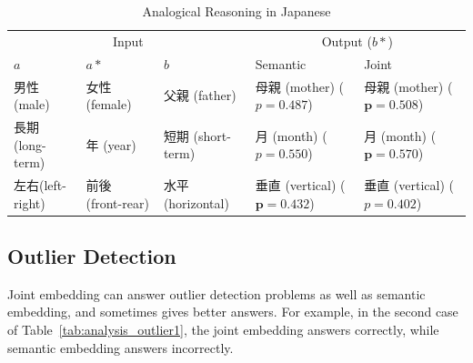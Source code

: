 \begin{table}[h]
    \centering
    \begin{CJK}{UTF8}{ipxm}
        \begin{tabularx}{\textwidth}{lllbb}
            \toprule
            \multicolumn{3}{c}{Input} & \multicolumn{2}{c}{Output ($b*$)} \\
            \cmidrule(lr){1-3} \cmidrule(lr){4-5} $a$ & $a*$ & $b$ & Semantic & Joint \\\midrule
            \vspace{0.2cm} 男性(male) & 女性 (female) & 父親 (father) & \mbox{母親} (mother) \newline ($p=0.487$) & \mbox{母親} (mother) \newline ($\bm{p=0.508}$) \\
            \vspace{0.2cm} 長期 (long-term) & 年 (year) & 短期 (short-term) & 月 (month) \newline ($p=0.550$) & 月 (month) \newline ($\bm{p=0.570}$) \\
            左右(left-right) & 前後 (front-rear) & 水平 (horizontal) & \mbox{垂直} (\mbox{vertical}) \newline ($\bm{p=0.432}$) & \mbox{垂直} (\mbox{vertical}) \newline ($p=0.402$) \\\bottomrule
        \end{tabularx}
    \end{CJK}
    \caption{Analogical Reasoning in Japanese}
    \label{tab:analysis_analogy2}
\end{table}

\subsection{Outlier Detection} \label{sec:analysis_outlier}

\begin{CJK}{UTF8}{gbsn}    
    Joint embedding can answer outlier detection problems as well as semantic embedding, and sometimes gives better answers. For example, in the second case of Table~\ref{tab:analysis_outlier1}, the joint embedding answers correctly, while semantic embedding answers incorrectly.
\end{CJK}

